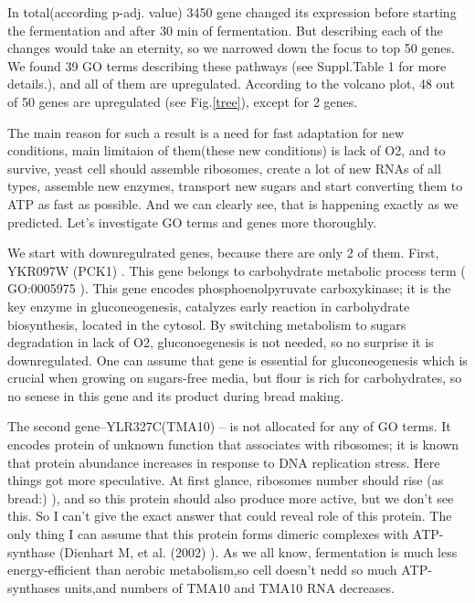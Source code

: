 \documentclass{article}
\begin{document}
 In total(according p-adj. value) 3450 gene changed its expression before starting the fermentation and after 30 min of fermentation. But describing each of the changes would take an eternity, so we narrowed down the focus to top 50 genes. We found 39 GO terms describing these pathways (see Suppl.Table 1 for more details.), and all of them are upregulated. According to the volcano plot, 48 out of 50 genes are upregulated (see Fig.\ref{tree}), except for 2 genes.
  
 The main reason for such a result is a need for fast adaptation for new conditions, main limitaion of them(these new conditions) is lack of O2, and to survive, yeast cell should assemble ribosomes, create a lot of new RNAs of all types, assemble new enzymes, transport new sugars and start converting them to ATP as fast as possible. And we can clearly see, that is happening exactly as we predicted. Let's investigate GO terms and genes more thoroughly.
 
 We start with downregulrated genes, because there are only 2 of them. First, YKR097W (PCK1)\cite{11} . This gene belongs to carbohydrate metabolic process term ( GO:0005975 ). This gene encodes phosphoenolpyruvate carboxykinase; it is the key enzyme in gluconeogenesis, catalyzes early reaction in carbohydrate biosynthesis, located in the cytosol. By switching metabolism to sugars degradation in lack of O2, gluconoegenesis is not needed, so no surprise it is downregulated. One can assume that gene is essential for gluconeogenesis which is crucial when growing on sugars-free media, but flour is rich for carbohydrates, so no senese in this gene and its product during bread making. 
 
 
 The second gene--YLR327C(TMA10)\cite{21}  -- is not allocated for any of GO terms. It encodes protein of unknown function that associates with ribosomes; it is known that protein abundance increases in response to DNA replication stress. Here things got more speculative. At first glance, ribosomes number should rise (as bread:) ), and so this protein should also produce more active, but we don't see this. So I can't give the exact answer that could reveal role of this protein. The only thing I can assume that this protein forms dimeric complexes with ATP-synthase (Dienhart M, et al. (2002)\cite{31} ). As we all know, fermentation is much less energy-efficient than aerobic metabolism,so cell doesn't nedd so much ATP-synthases units,and numbers of TMA10 and TMA10 RNA decreases.
 
\end{document}

